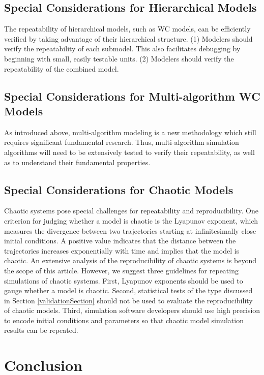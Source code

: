 \documentclass[journal,transmag,twoside]{IEEEtran}
\begin{document}
\subsection{Special Considerations for Hierarchical Models}
The repeatability of hierarchical models, such as WC models, can be efficiently verified by taking advantage of their hierarchical structure. (1) Modelers should verify the repeatability of each submodel. This also facilitates debugging by beginning with small, easily testable units. (2) Modelers should verify the repeatability of the combined model.

\subsection{Special Considerations for Multi-algorithm WC Models}
As introduced above, multi-algorithm modeling is a new methodology which still requires significant fundamental research. Thus, multi-algorithm simulation algorithms will need to be extensively tested to verify their repeatability, as well as to understand their fundamental properties.

\subsection{Special Considerations for Chaotic Models}

Chaotic systems pose special challenges for repeatability and reproducibility. One criterion for judging whether a model is chaotic is the Lyapunov exponent, which measures the divergence between two trajectories starting at infinitesimally close initial conditions. A positive value indicates that the distance between the trajectories increases exponentially with time and implies that the model is chaotic. An extensive analysis of the reproducibility of chaotic systems is beyond the scope of this article. However, we suggest three guidelines for repeating simulations of chaotic systems. First, Lyapunov exponents should be used to gauge whether a model is chaotic. Second, statistical tests of the type discussed in Section \ref{validationSection} should not be used to evaluate the reproducibility of chaotic models. Third, simulation software developers should use high precision to encode initial conditions and parameters so that chaotic model simulation results can be repeated.

\section{Conclusion}
\end{document}
